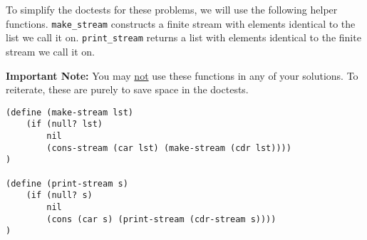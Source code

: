 To simplify the doctests for these problems, we will use the following helper functions. \lstinline{make_stream} constructs a finite stream with elements identical to the list we call it on. \lstinline{print_stream} returns a list with elements identical to the finite stream we call it on.

\textbf{Important Note:} You may \underline{not} use these functions in any of your solutions. To reiterate, these are purely to save space in the doctests.

\begin{lstlisting}
(define (make-stream lst)
    (if (null? lst)
        nil
        (cons-stream (car lst) (make-stream (cdr lst))))
)

(define (print-stream s)
    (if (null? s)
        nil
        (cons (car s) (print-stream (cdr-stream s))))
)
\end{lstlisting}